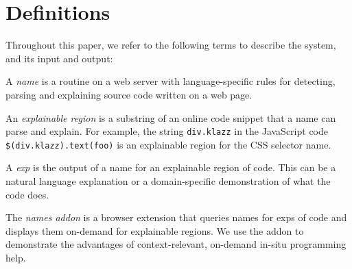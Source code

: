 \section{Definitions}

Throughout this paper,  we refer to the following terms to describe the system, and its input and output:

A \emph{\Gls{name}} is a routine on a web server with language-specific rules for detecting, parsing and explaining source code written on a web page.

An \emph{explainable region} is a substring of an online code snippet that a \Gls{name} can parse and explain.  For example, the string \texttt{div.klazz} in the JavaScript code \texttt{\$(\qs{}div.klazz\qs{}).text(\qs{}foo\qs{})} is an explainable region for the CSS selector \Gls{name}.

A \emph{\gls{exp}} is the output of a \Gls{name} for an explainable region of code. This can be a natural language explanation or a domain-specific demonstration of what the code does.


The \emph{\Glspl{name} addon} is a browser extension that queries \Glspl{name} for \glspl{exp} of code and displays them on-demand for explainable regions.  We use the addon to demonstrate the advantages of context-relevant, on-demand in-situ programming help.

